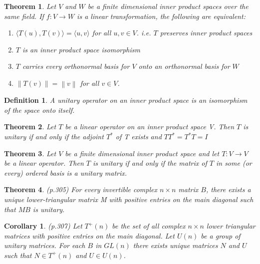 \documentclass{article}
\newcommand{\norm}[1]{\left\lVert#1\right\rVert}
\newcommand{\innerproduct}[1]{\langle#1\rangle}
\newtheorem{theorem}{Theorem}[section]
\newtheorem{definition}{Definition}[section]
\newtheorem{corollary}{Corollary}[theorem]
\numberwithin{theorem}{subsection} %
\numberwithin{definition}{subsection} %
\begin{document}
\begin{theorem}
    Let $V$ and $W$ be a finite dimensional inner product spaces over the same field.  If
    $f : V \rightarrow W$ is a linear transformation, the following are equivalent:

    \begin{enumerate}
        \item $\innerproduct{T(u),T(v)} = \innerproduct{u,v}$ for all $u,v \in V$. i.e. $T$ preserves inner product spaces
        \item $T$ is an inner product space isomorphism
        \item $T$ carries every orthonormal basis for $V$ onto an orthonormal basis for $W$
        \item $\norm{T(v)}=\norm{v}$ for all $v \in V$.
    \end{enumerate}
\end{theorem}

\begin{definition}
    A unitary operator on an inner product space is an isomorphism of the space onto
    itself.
\end{definition}

\begin{theorem}
    Let $T$ be a linear operator on an inner product space V. Then $T$ is unitary if and
    only if the adjoint $T^*$ of  T exists and $TT^*=T^*T = I$
\end{theorem}

\begin{theorem}
    Let $V$ be a finite dimensional inner product space and let $T: V \rightarrow V$ be
    a linear operator. Then $T$ is unitary if and only if the matrix of $T$ in some (or every) ordered basis is
a unitary matrix. 
\end{theorem}

\begin{theorem}
    (p.305)
    For every invertible complex $n \times n$ matrix $B$, there exists a unique lower-triangular
    matrix M with positive entries on the main diagonal such that $MB$ is unitary.
\end{theorem}

\begin{corollary}
    (p.307)
    Let $T^+(n)$ be the set of all complex $n \times n$ lower triangular matrices with
    positive entries on the main diagonal. Let $U(n)$ be a group of unitary matrices. For each $B$ in $GL(n)$ there exists unique matrices $N$ and $U$ such that $N \in
    T^+(n)$ and $U \in U(n)$.
\end{corollary}
\end{document}
